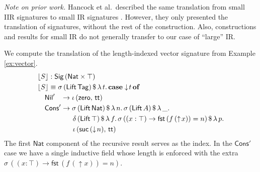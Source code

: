 \documentclass[acmsmall,screen,review,anonymous]{acmart}
\newcommand{\msf}[1]{{\mathsf{#1}}}
\newcommand{\mbf}[1]{{\mathbf{#1}}}
\newcommand{\Nat}{\msf{Nat}}
\newcommand{\zero}{\msf{zero}}
\newcommand{\suc}{\msf{suc}}
\newcommand{\Nil}{\msf{Nil}}
\newcommand{\Cons}{\msf{Cons}}
\newcommand{\Lift}{\msf{Lift}}
\newcommand{\lup}{\uparrow}
\newcommand{\ldown}{\downarrow}
\newcommand{\Sig}{\msf{Sig}}
\newcommand{\Tag}{\msf{Tag}}
\newcommand{\case}{\mbf{case}}
\newcommand{\of}{\mbf{of}}
\newcommand{\ttt}{\msf{tt}}
\newcommand{\fst}{\msf{fst}}
\newcommand{\floord}[1]{\lfloor #1 \rfloor}
\begin{document}
\emph{Note on prior work.} Hancock et al.\ described the same translation from small IIR signatures
to small IR signatures \cite[Section~6]{DBLP:conf/tlca/HancockMGMA13}. However, they only presented
the translation of signatures, without the rest of the construction. Also, constructions and results
for small IR do not generally transfer to our case of ``large'' IR.

\begin{example} We compute the translation of the length-indexed vector signature from Example \ref{ex:vector}.
\begin{alignat*}{4}
  & \floord{S} : \Sig\,(\Nat \times \top)\\
  & \floord{S} \equiv \sigma\,(\Lift\,\Tag)\,\$\,\lambda\,t.\,\case \ldown\!t\,\of \\
  & \quad \Nil'\hspace{0.85em} \to \iota\,(\zero,\,\ttt) \\
  & \quad \Cons'\to \sigma\,(\Lift\,\Nat)\,\$\,\lambda\,n.\,\sigma\,(\Lift\,A)\,\$\,\lambda\,\_.\\
  & \quad \hspace{4em}  \delta\,(\Lift\,\top)\,\$\,\lambda\,f.\,\sigma\,((x : \top) \to \fst\,(f\,(\lup\!x)) = n)\,\$\,\lambda\,p.\\
  & \quad \hspace{4em}  \iota\,(\suc\,(\ldown\!n),\,\ttt)
\end{alignat*}
The first $\Nat$ component of the recursive result serves as the index. In the $\Cons'$ case we
have a single inductive field whose length is enforced with the extra $\sigma\,((x : \top) \to
\fst\,(f\,(\lup\!x)) = n)$.

\end{example}
\end{document}
